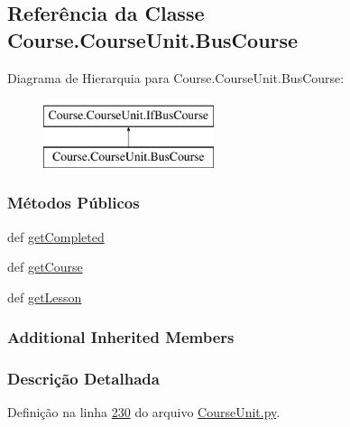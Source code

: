 \hypertarget{classCourse_1_1CourseUnit_1_1BusCourse}{\subsection{Referência da Classe Course.\-Course\-Unit.\-Bus\-Course}
\label{classCourse_1_1CourseUnit_1_1BusCourse}
}
Diagrama de Hierarquia para Course.\-Course\-Unit.\-Bus\-Course\-:\begin{figure}[H]
\begin{center}
\leavevmode
\includegraphics[height=2.000000cm]{d9/d88/classCourse_1_1CourseUnit_1_1BusCourse}
\end{center}
\end{figure}
\subsubsection*{Métodos Públicos}
\begin{DoxyCompactItemize}
\item 
def \hyperlink{classCourse_1_1CourseUnit_1_1BusCourse_ae10471abc4ea6bdaa2e0a6ebc1069889}{get\-Completed}
\item 
def \hyperlink{classCourse_1_1CourseUnit_1_1BusCourse_ac7306e270597d7aac641d956f8e3f31f}{get\-Course}
\item 
def \hyperlink{classCourse_1_1CourseUnit_1_1BusCourse_ac7325f4b22028b3885d52d14af3a12cf}{get\-Lesson}
\end{DoxyCompactItemize}
\subsubsection*{Additional Inherited Members}


\subsubsection{Descrição Detalhada}


Definição na linha \hyperlink{CourseUnit_8py_source_l00230}{230} do arquivo \hyperlink{CourseUnit_8py_source}{Course\-Unit.\-py}.



